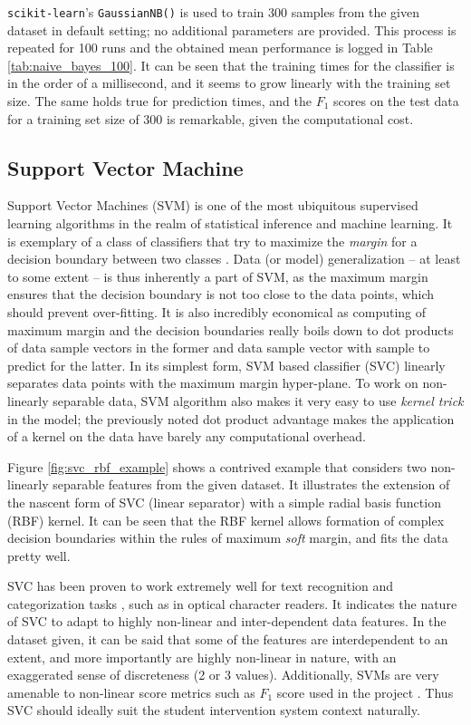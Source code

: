 \documentclass{article}
\begin{document}
	\texttt{scikit-learn}'s \texttt{GaussianNB()} is used to train 300 samples from the given dataset in default setting; no additional parameters are provided. This process is repeated for 100 runs and the obtained mean performance is logged in Table \ref{tab:naive_bayes_100}. It can be seen that the training times for the classifier is in the order of a millisecond, and it seems to grow linearly with the training set size. The same holds true for prediction times, and the $F_1$ scores on the test data for a training set size of 300 is remarkable, given the computational cost. 
	        
	\subsection{Support Vector Machine}
	Support Vector Machines (SVM) is one of the most ubiquitous supervised learning algorithms in the realm of statistical inference and machine learning. It is exemplary of a class of classifiers that try to maximize the \emph{margin} for a decision boundary between two classes \cite{boser1992}. Data (or model) generalization -- at least to some extent -- is thus inherently a part of SVM, as the maximum margin ensures that the decision boundary is not too close to the data points, which should prevent over-fitting. It is also incredibly economical as computing of maximum margin and the decision boundaries really boils down to dot products of data sample vectors in the former and data sample vector with sample to predict for the latter. In its simplest form, SVM based classifier (SVC) linearly separates data points with the maximum margin hyper-plane. To work on non-linearly separable data, SVM algorithm also makes it very easy to use \emph{kernel trick} in the model; the previously noted dot product advantage makes the application of a kernel on the data have barely any computational overhead. 
	
	Figure \ref{fig:svc_rbf_example} shows a contrived example that considers two non-linearly separable features from the given dataset. It illustrates the extension of the nascent form of SVC (linear separator) with a simple radial basis function (RBF) kernel. It can be seen that the RBF kernel allows formation of complex decision boundaries within the rules of maximum \emph{soft} margin, and fits the data pretty well. 
	
	SVC has been proven to work extremely well for text recognition and categorization tasks \cite{boser1992,joachims1998}, such as in optical character readers. It indicates the nature of SVC to adapt to highly non-linear and inter-dependent data features. In the dataset given, it can be said that some of the features are interdependent to an extent, and more importantly are highly non-linear in nature, with an exaggerated sense of discreteness (2 or 3 values). Additionally, SVMs are very amenable to non-linear score metrics such as $F_1$ score used in the project \cite{joachims2005}. Thus SVC should ideally suit the student intervention system context naturally.
	
\end{document}

